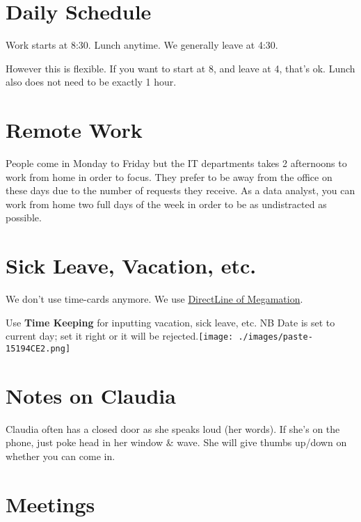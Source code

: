 \documentclass[
  letterpaper,
  DIV=11,
  numbers=noendperiod,
  oneside]{scrreprt}
\begin{document}
\hypertarget{daily-schedule}{%
\section{Daily Schedule}\label{daily-schedule}}

Work starts at 8:30. Lunch anytime. We generally leave at 4:30.

However this is flexible. If you want to start at 8, and leave at 4,
that's ok. Lunch also does not need to be exactly 1 hour.

\hypertarget{remote-work}{%
\section{Remote Work}\label{remote-work}}

People come in Monday to Friday but the IT departments takes 2
afternoons to work from home in order to focus. They prefer to be away
from the office on these days due to the number of requests they
receive. As a data analyst, you can work from home two full days of the
week in order to be as undistracted as possible.

\hypertarget{sick-leave-vacation-etc.}{%
\section{Sick Leave, Vacation, etc.}\label{sick-leave-vacation-etc.}}

We don't use time-cards anymore. We use
\href{https://m.megamation.com/uog/dlweb.php/O4W_MOBILE_MAIN}{DirectLine
of Megamation}.

Use \textbf{Time Keeping} for inputting vacation, sick leave, etc. NB
Date is set to current day; set it right or it will be
rejected.\texttt{[image: ./images/paste-15194CE2.png]}

\hypertarget{notes-on-claudia}{%
\section{Notes on Claudia}\label{notes-on-claudia}}

Claudia often has a closed door as she speaks loud (her words). If she's
on the phone, just poke head in her window \& wave. She will give thumbs
up/down on whether you can come in.

\hypertarget{meetings}{%
\section{Meetings}\label{meetings}}
\end{document}
